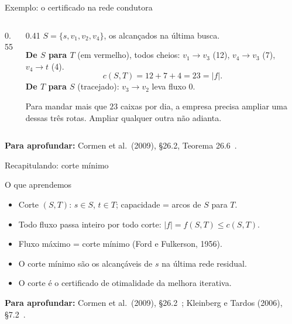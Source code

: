 \documentclass[aspectratio=169,xcolor=table]{beamer}
\newcommand{\nosrede}[1]{%
  \node[vert] (s)  at (0,0)     {$s$};
  \node[vert] (v1) at (1.7,1)   {$v_1$};
  \node[vert] (v2) at (1.7,-1)  {$v_2$};
  \node[vert] (v3) at (3.6,1)   {$v_3$};
  \node[vert] (v4) at (3.6,-1)  {$v_4$};
  \node[vert] (t)  at (5.3,0)   {$t$};
  \def\lista{#1}\ifx\lista\empty\else
    \foreach \v/\n in {#1} \node[vS] at (\v) {$\n$};\fi
}
\newcommand{\rede}[2]{%
  \nosrede{#2}
  \edef\arcosR{#1}
  \foreach \u/\v/\l/\e in \arcosR \draw[\e] (\u) to (\v);
  \foreach \u/\v/\l/\e in \arcosR \path (\u) to node[peso] {\l} (\v);
}
\newcommand{\fonte}[1]{%
  \vfill
  {\tiny\color{gray!55!black}\textbf{Para aprofundar:} #1\par}%
}
\begin{document}
\begin{frame}{Exemplo: o certificado na rede condutora}
  \begin{columns}[c]
    \begin{column}{0.55\textwidth}
      \begin{center}
      \end{center}
    \end{column}
    \begin{column}{0.41\textwidth}
      \scriptsize
      $S = \{s, v_1, v_2, v_4\}$, os alcançados na última busca.
      \medskip

      \textbf{De $S$ para $T$} (em vermelho), todos cheios:
      $v_1 \to v_3$ (12), $v_4 \to v_3$ (7), $v_4 \to t$ (4).
      \[ c(S,T) = 12 + 7 + 4 = 23 = |f|. \]
      \textbf{De $T$ para $S$} (tracejado): $v_3 \to v_2$ leva fluxo $0$.
      \medskip

      Para mandar mais que $23$ caixas por dia, a empresa precisa ampliar uma dessas três rotas.
      Ampliar qualquer outra não adianta.
    \end{column}
  \end{columns}
  \fonte{Cormen et al.\ (2009), \S 26.2, Teorema 26.6~\cite{cormen2009introduction}.}
\end{frame}

\begin{frame}{Recapitulando: corte mínimo}
  \begin{block}{O que aprendemos}
    \begin{itemize}
      \item Corte $(S,T)$: $s \in S$, $t \in T$; capacidade = arcos de $S$ para $T$.
      \item Todo fluxo passa inteiro por todo corte: $|f| = f(S,T) \le c(S,T)$.
      \item Fluxo máximo = corte mínimo (Ford e Fulkerson, 1956).
      \item O corte mínimo são os alcançáveis de $s$ na última rede residual.
      \item O corte é o certificado de otimalidade da melhora iterativa.
    \end{itemize}
  \end{block}
  \fonte{Cormen et al.\ (2009), \S 26.2~\cite{cormen2009introduction};
    Kleinberg e Tardos (2006), \S 7.2~\cite{kleinberg2006algorithm}.}
\end{frame}
\end{document}

